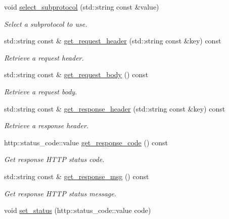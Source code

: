 \begin{DoxyCompactItemize}
void \mbox{\hyperlink{classwebsocketpp_1_1connection_a96b37fbab88dfb78b1641c0c30710243}{select\+\_\+subprotocol}} (std\+::string const \&value)
\begin{DoxyCompactList}\small\item\em Select a subprotocol to use. \end{DoxyCompactList}\item 
std\+::string const  \& \mbox{\hyperlink{classwebsocketpp_1_1connection_a542dd013907c3aeb2dbb01d1d631a492}{get\+\_\+request\+\_\+header}} (std\+::string const \&key) const
\begin{DoxyCompactList}\small\item\em Retrieve a request header. \end{DoxyCompactList}\item 
std\+::string const  \& \mbox{\hyperlink{classwebsocketpp_1_1connection_a187c640f1352e74a00c0f8b6177da94a}{get\+\_\+request\+\_\+body}} () const
\begin{DoxyCompactList}\small\item\em Retrieve a request body. \end{DoxyCompactList}\item 
std\+::string const  \& \mbox{\hyperlink{classwebsocketpp_1_1connection_a72e0c94609844078fc611716c39791de}{get\+\_\+response\+\_\+header}} (std\+::string const \&key) const
\begin{DoxyCompactList}\small\item\em Retrieve a response header. \end{DoxyCompactList}\item 
http\+::status\+\_\+code\+::value \mbox{\hyperlink{classwebsocketpp_1_1connection_a32a160dedfda82a678bc61a18fda12b3}{get\+\_\+response\+\_\+code}} () const
\begin{DoxyCompactList}\small\item\em Get response H\+T\+TP status code. \end{DoxyCompactList}\item 
std\+::string const  \& \mbox{\hyperlink{classwebsocketpp_1_1connection_a9fd34116c40027378b0040b4076503eb}{get\+\_\+response\+\_\+msg}} () const
\begin{DoxyCompactList}\small\item\em Get response H\+T\+TP status message. \end{DoxyCompactList}\item 
void \mbox{\hyperlink{classwebsocketpp_1_1connection_a96d445ff0cc75b854c4500e93a054acb}{set\+\_\+status}} (http\+::status\+\_\+code\+::value code)

\end{DoxyCompactItemize}
